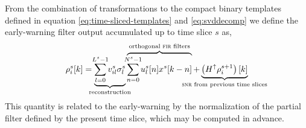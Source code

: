 From the combination of transformations to the compact binary templates defined
in equation \eqref{eq:time-sliced-templates} and \eqref{eq:svddecomp} we define
the early-warning filter output accumulated up to time slice $s$ as,
%
%
\begin{equation}
	\rho_i^s [k] =%
		\underbrace{
			\sum_{\mathclap{l=0}}^{\mathclap{L^s-1}} v_{il}^s \sigma_l^s
		}_\textrm{\clap{reconstruction}}
		\overbrace{
			\sum_{\mathclap{n=0}}^{\mathclap{N^s-1}} u_l^s[n] x^s[k-n]
		}^\textrm{\clap{orthogonal {\sc fir} filters}}
		+
		\underbrace{
			\left(H^\uparrow \rho_i^{s+1}\right)[k]
		}_\textrm{\clap{{\sc snr} from previous time slices}}
\end{equation}
%
%
This quantity is related to the early-warning \SNR{} by the normalization
of the partial filter defined by the present time slice, which may be computed
in advance. 
%
%

